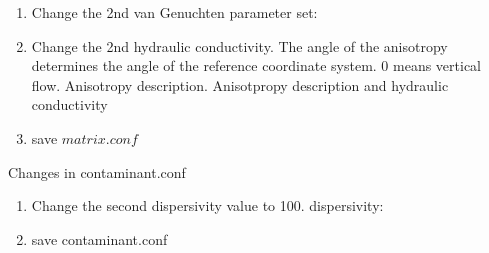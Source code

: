 \begin{enumerate}
	\item Change the 2nd van Genuchten parameter set: \\ 
	\item Change the 2nd hydraulic conductivity. The angle of the anisotropy determines the angle of the reference coordinate system. 0 means vertical flow. Anisotropy description. Anisotpropy description and hydraulic conductivity\\ 
	\item save $matrix.conf$
\end{enumerate}

Changes in contaminant.conf
\begin{enumerate}
	\item Change the second dispersivity value to 100.
		dispersivity: \\ 
	\item save contaminant.conf
\end{enumerate}


